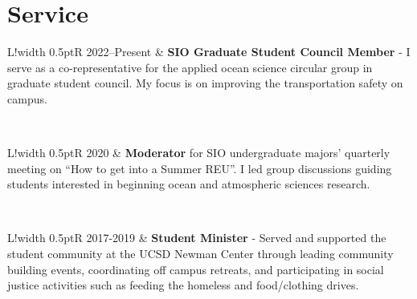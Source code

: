 \documentclass[10pt]{article}
\newcommand\VRule{\color{lightgray}\vrule width 0.5pt}
\begin{document}
\vspace{.3cm}
\section*{Service}
\vspace{.3cm}
\begin{tabular}{L!{\VRule}R}
2022--Present & \textbf{SIO Graduate Student Council Member} - I serve as a co-representative for the applied ocean science circular group in graduate student council. My focus is on improving the transportation safety on campus.\\[5pt]
\end{tabular} 
\\[10pt]
\begin{tabular}{L!{\VRule}R}
2020 & \textbf{Moderator} for SIO undergraduate majors’ quarterly meeting on ``How to get into a Summer REU''. I led group discussions guiding students interested in beginning ocean and atmospheric sciences research. 
\end{tabular}
\\[10pt]
\begin{tabular}{L!{\VRule}R}
2017-2019 & \textbf{Student Minister} - Served and supported the student community at the UCSD Newman Center through leading community building events, coordinating off campus retreats, and participating in social justice activities such as feeding the homeless and food/clothing drives.  \\[5pt]
\end{tabular} 

\vspace{.3cm}
\end{document}

